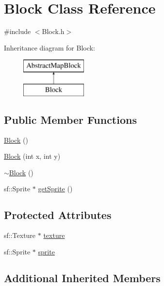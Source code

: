 \hypertarget{class_block}{}\section{Block Class Reference}
\label{class_block}


{\ttfamily \#include $<$Block.\+h$>$}

Inheritance diagram for Block\+:\begin{figure}[H]
\begin{center}
\leavevmode
\includegraphics[height=2.000000cm]{class_block}
\end{center}
\end{figure}
\subsection*{Public Member Functions}
\begin{DoxyCompactItemize}
\item 
\hyperlink{class_block_a37658a946bf5067ad01d68d9ff086adc}{Block} ()
\item 
\hyperlink{class_block_a3ff2925a4aa73cb9cabe5097b79f636e}{Block} (int x, int y)
\item 
\hyperlink{class_block_a19d1bd0e1cef6a865ed2745a2e648405}{$\sim$\+Block} ()
\item 
sf\+::\+Sprite $\ast$ \hyperlink{class_block_acd9b061af3ad9e79cf49bf9d4dc3d8b9}{get\+Sprite} ()
\end{DoxyCompactItemize}
\subsection*{Protected Attributes}
\begin{DoxyCompactItemize}
\item 
sf\+::\+Texture $\ast$ \hyperlink{class_block_a61ef2e4fef4ab4a950d3217f88cb8369}{texture}
\item 
sf\+::\+Sprite $\ast$ \hyperlink{class_block_a5cf88ebac5cc92a309ec3e0d9c9d5fe8}{sprite}
\end{DoxyCompactItemize}
\subsection*{Additional Inherited Members}


